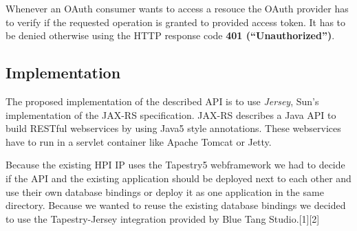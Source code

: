 Whenever an OAuth consumer wants to access a resouce the OAuth
provider has to verify if the requested operation is granted to
provided access token. It has to be denied otherwise using the HTTP
response code \textbf{401 (``Unauthorized'')}.

\subsection{Implementation}

The proposed implementation of the described API is to use
\emph{Jersey}, Sun's implementation of the JAX-RS specification.
JAX-RS describes a Java API to build RESTful webservices by using
Java5 style annotations. These webservices have to run in a servlet
container like Apache Tomcat or Jetty.

Because the existing HPI IP uses the Tapestry5 webframework we had
to decide if the API and the existing application should be
deployed next to each other and use their own database bindings or
deploy it as one application in the same directory. Because we
wanted to reuse the existing database bindings we decided to use
the Tapestry-Jersey integration provided by Blue Tang
Studio.[1][2]
